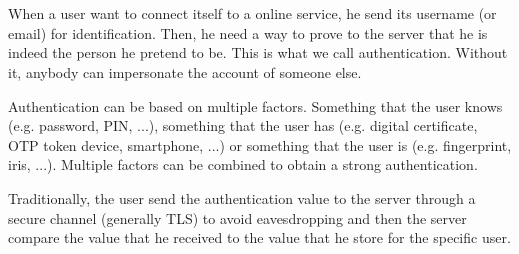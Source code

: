 \documentclass[../report.tex]{subfiles}
\begin{document}


\chapter{}






\section{}
\subsection{}

\paragraph{}

When a user want to connect itself to a online service, he send its username (or email) for identification. Then, he need a way to prove to the server that he is indeed the person he pretend to be. This is what we call authentication. Without it, anybody can impersonate the account of someone else.

Authentication can be based on multiple factors. Something that the user knows (e.g. password, PIN, ...), something that the user has (e.g. digital certificate, OTP token device, smartphone, ...) or something that the user is (e.g. fingerprint, iris, ...). Multiple factors can be combined to obtain a strong authentication.

Traditionally, the user send the authentication value to the server through a secure channel (generally TLS) to avoid eavesdropping and then the server compare the value that he received to the value that he store for the specific user.
\end{document}
